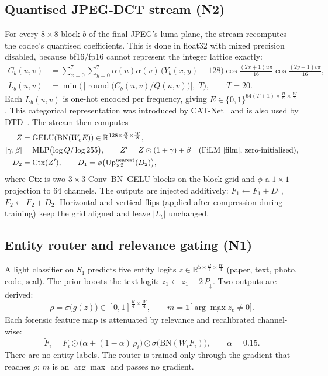 \documentclass[10pt,a4paper]{article}
\newcommand{\R}{\mathbb{R}}
\begin{document}
\subsection{Quantised JPEG-DCT stream \textnormal{(N2)}}\label{sec:qdct}
For every $8\times8$ block $b$ of the final JPEG's luma plane, the stream recomputes the
codec's quantised coefficients. This is done in float32 with mixed precision disabled,
because bf16/fp16 cannot represent the integer lattice exactly:
\begin{align}
C_b(u,v) &= \sum_{x=0}^{7}\sum_{y=0}^{7}\alpha(u)\alpha(v)\,\bigl(Y_b(x,y)-128\bigr)
           \cos\tfrac{(2x+1)u\pi}{16}\cos\tfrac{(2y+1)v\pi}{16},\\
L_b(u,v) &= \min\bigl(\,\bigl|\operatorname{round}\bigl(C_b(u,v)/Q(u,v)\bigr)\bigr|,\;T\bigr),
           \qquad T=20 .
\end{align}
Each $L_b(u,v)$ is one-hot encoded per frequency, giving
$E\in\{0,1\}^{64(T+1)\times\frac H8\times\frac W8}$. This categorical representation was
introduced by CAT-Net~\cite{catnet} and is also used by DTD~\cite{dtd}. The stream then
computes
\begin{align}
Z &= \mathrm{GELU}(\mathrm{BN}(W_e E)) \in \R^{128\times\frac H8\times\frac W8},\\
[\gamma,\beta] &= \mathrm{MLP}\bigl(\log Q/\log 255\bigr),\qquad
Z' = Z\odot(1+\gamma)+\beta \quad\text{(FiLM~\cite{film}, zero-initialised)},\\
D_2 &= \mathrm{Ctx}(Z'),\qquad D_1 = \phi\bigl(\mathrm{Up}^{\mathrm{nearest}}_{\times2}(D_2)\bigr),
\end{align}
where $\mathrm{Ctx}$ is two $3\times3$ Conv--BN--GELU blocks on the block grid and $\phi$ a
$1\times1$ projection to 64 channels. The outputs are injected additively:
$F_1\leftarrow F_1+D_1$, $F_2\leftarrow F_2+D_2$. Horizontal and vertical flips (applied
after compression during training) keep the grid aligned and leave $|L_b|$ unchanged.

\subsection{Entity router and relevance gating \textnormal{(N1)}}\label{sec:router}
A light classifier on $S_1$ predicts five entity logits
$z\in\R^{5\times\frac H4\times\frac W4}$ (paper, text, photo, code, seal). The prior
boosts the text logit: $z_1\leftarrow z_1+2\,P_{\downarrow}$. Two outputs are derived:
\begin{equation}
\rho=\sigma\bigl(g(z)\bigr)\in[0,1]^{\frac H4\times\frac W4},\qquad
m=\mathbb{1}\bigl[\arg\max_c z_c\neq 0\bigr].
\end{equation}
Each forensic feature map is attenuated by relevance and recalibrated channel-wise:
\begin{equation}
\tilde F_i = F_i\odot\bigl(\alpha+(1-\alpha)\,\rho_i\bigr)\odot\sigma\bigl(\mathrm{BN}(W_iF_i)\bigr),\qquad \alpha=0.15 .
\end{equation}
There are no entity labels. The router is trained only through the gradient that reaches
$\rho$; $m$ is an $\arg\max$ and passes no gradient.
\end{document}
